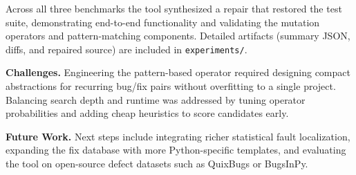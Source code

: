 \documentclass[11pt]{article}
\begin{document}
Across all three benchmarks the tool synthesized a repair that restored the test suite, demonstrating end-to-end functionality and validating the mutation operators and pattern-matching components. Detailed artifacts (summary JSON, diffs, and repaired source) are included in \texttt{experiments/}.

\textbf{Challenges.} Engineering the pattern-based operator required designing compact abstractions for recurring bug/fix pairs without overfitting to a single project. Balancing search depth and runtime was addressed by tuning operator probabilities and adding cheap heuristics to score candidates early.

\textbf{Future Work.} Next steps include integrating richer statistical fault localization, expanding the fix database with more Python-specific templates, and evaluating the tool on open-source defect datasets such as QuixBugs or BugsInPy.
\end{document}
